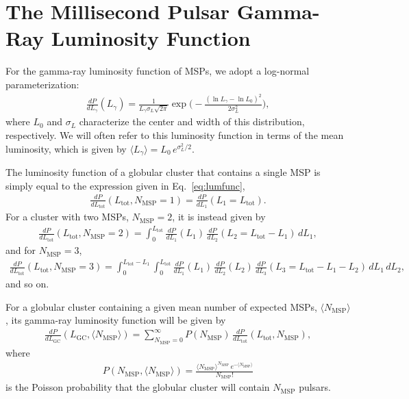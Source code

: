 \section{The Millisecond Pulsar Gamma-Ray Luminosity Function}
\label{sec:glf}

For the gamma-ray luminosity function of MSPs, we adopt a log-normal parameterization:
%
\begin{align}
\frac{dP}{dL_{\gamma}}(L_{\gamma}) = \frac{1}{L_{\gamma} \sigma_L \sqrt{2\pi}} \exp\bigg(-\frac{(\ln L_{\gamma} - \ln L_0)^2}{2 \sigma_L^2}\bigg),
\label{eq:lumfunc}
\end{align}
%
where $L_0$ and $\sigma_L$ characterize the center and width of this distribution, respectively. We will often refer to this luminosity function in terms of the mean luminosity, which is given by $\langle L_{\gamma} \rangle = L_0 \, e^{\sigma_L^2/2}$.

The luminosity function of a globular cluster that contains a single MSP is simply equal to the expression given in Eq.~\ref{eq:lumfunc},
%
\begin{align}
\frac{dP}{dL_\textrm{tot}} (L_\textrm{tot}, N_\textrm{MSP}=1) = \frac{dP}{dL_{1}}(L_1=L_\textrm{tot}). 
\end{align}
%
For a cluster with two MSPs, $N_\textrm{MSP}=2$, it is instead given by
%
\begin{align}
\frac{dP}{dL_\textrm{tot}}(L_\textrm{tot}, N_\textrm{MSP}=2) =  \int_0^{L_\textrm{tot}} \frac{dP}{dL_1}(L_1) \, \frac{dP}{dL_2}(L_2=L_\textrm{tot}-L_1) \, dL_1,
\end{align}
%
and for $N_\textrm{MSP}=3$,
%
\begin{align}
\frac{dP}{dL_\textrm{tot}}(L_\textrm{tot}, N_\textrm{MSP}=3)  = \int_0^{L_\textrm{tot}-L_1} \int_0^{L_\textrm{tot}} \frac{dP}{dL_1}(L_1) \, \frac{dP}{dL_2}(L_2) \,\frac{dP}{dL_3}(L_3=L_\textrm{tot}-L_1-L_2) \, dL_1 \, dL_2,
\end{align}
%
and so on.

For a globular cluster containing a given mean number of expected MSPs, $\langle N_\textrm{MSP}\rangle$, its gamma-ray luminosity function will be given by
%
\begin{align}
\frac{dP}{dL_\textrm{GC}}(L_\textrm{GC},\langle N_\textrm{MSP}\rangle)  = \sum_{N_\textrm{MSP}=0}^\infty P(N_\textrm{MSP}) \, \frac{dP}{dL_\textrm{tot}}(L_\textrm{tot}, N_\textrm{MSP}),
\label{eq:glf}
\end{align}
%
where 
%
\begin{align}
P(N_\textrm{MSP},\langle N_\textrm{MSP}\rangle)= \frac{\langle N_\textrm{MSP}\rangle^{N_\textrm{MSP}} \, e^{-\langle N_\textrm{MSP}\rangle}}{N_\textrm{MSP}!}
\end{align}
%
is the Poisson probability that the globular cluster will contain $N_\textrm{MSP}$ pulsars.


